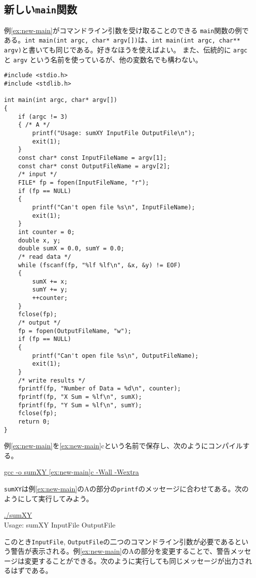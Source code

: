 \subsection{新しい\texttt{main}関数}

例\ref{ex:new-main}がコマンドライン引数を受け取ることのできる \texttt{main}関数の例である。\texttt{int main(int argc, char* argv[])}は、\texttt{int main(int argc, char** argv)}と書いても同じである。好きなほうを使えばよい。
また、伝統的に \texttt{argc} と \texttt{argv} という名前を使っているが、他の変数名でも構わない。
\begin{reidai}\label{ex:new-main}
    \begin{verbatim}
#include <stdio.h>
#include <stdlib.h>

int main(int argc, char* argv[])
{
    if (argc != 3)
    { /* A */
        printf("Usage: sumXY InputFile OutputFile\n");
        exit(1);
    }
    const char* const InputFileName = argv[1];
    const char* const OutputFileName = argv[2];
    /* input */
    FILE* fp = fopen(InputFileName, "r");
    if (fp == NULL)
    {
        printf("Can't open file %s\n", InputFileName);
        exit(1);
    }
    int counter = 0;
    double x, y;
    double sumX = 0.0, sumY = 0.0;
    /* read data */
    while (fscanf(fp, "%lf %lf\n", &x, &y) != EOF)
    {
        sumX += x;
        sumY += y;
        ++counter;
    }
    fclose(fp);
    /* output */
    fp = fopen(OutputFileName, "w");
    if (fp == NULL)
    {
        printf("Can't open file %s\n", OutputFileName);
        exit(1);
    }
    /* write results */
    fprintf(fp, "Number of Data = %d\n", counter);
    fprintf(fp, "X Sum = %lf\n", sumX);
    fprintf(fp, "Y Sum = %lf\n", sumY);
    fclose(fp);
    return 0;
}
\end{verbatim}
\end{reidai} \noindent
例\ref{ex:new-main}を\ref{ex:new-main}cという名前で保存し、次のようにコンパイルする。
\begin{commandline2}
    \prompt \underline{gcc -o sumXY \ref{ex:new-main}c -Wall -Wextra}
\end{commandline2} \noindent
\texttt{sumXY}は例\ref{ex:new-main}のAの部分の\texttt{printf}のメッセージに合わせてある。次のようにして実行してみよう。
\begin{commandline2}
    \prompt \underline{./sumXY}\\
    Usage: sumXY InputFile OutputFile
\end{commandline2} \noindent
このとき\texttt{InputFile}, \texttt{OutputFile}の二つのコマンドライン引数が必要であるという警告が表示される。例\ref{ex:new-main}のAの部分を変更することで、警告メッセージは変更することができる。次のように実行しても同じメッセージが出力されるはずである。
